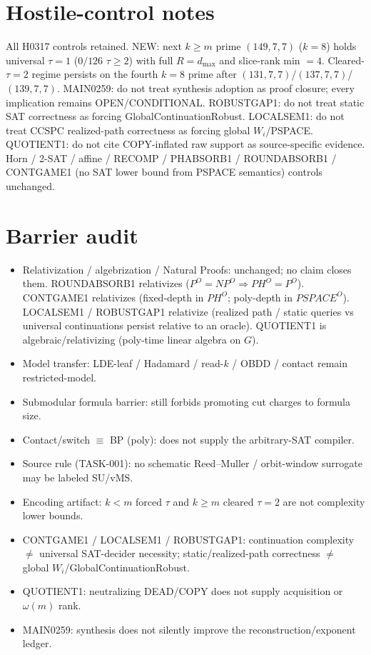 \documentclass[11pt]{article}
\begin{document}
\section*{Hostile-control notes}
All H0317 controls retained. NEW: next $k{\ge}m$ prime $(149,7,7)$ ($k{=}8$) holds universal
$\tau{=}1$ ($0/126$ $\tau{\ge}2$) with full $R{=}d_{\max}$ and slice-rank min $=4$.
Cleared-$\tau{=}2$ regime persists on the fourth $k{=}8$ prime after $(131,7,7)$/$(137,7,7)$/$(139,7,7)$.
MAIN0259: do not treat synthesis adoption as proof closure; every implication remains OPEN/CONDITIONAL.
ROBUSTGAP1: do not treat static SAT correctness as forcing GlobalContinuationRobust.
LOCALSEM1: do not treat CCSPC realized-path correctness as forcing global $W_i$/PSPACE.
QUOTIENT1: do not cite COPY-inflated raw support as source-specific evidence. Horn / 2-SAT / affine /
RECOMP / PHABSORB1 / ROUNDABSORB1 / CONTGAME1 (no SAT lower bound from PSPACE semantics)
controls unchanged.

\section*{Barrier audit}
\begin{itemize}
\item Relativization / algebrization / Natural Proofs: unchanged; no claim closes them.
  ROUNDABSORB1 relativizes ($P^O{=}NP^O\Rightarrow PH^O{=}P^O$).
  CONTGAME1 relativizes (fixed-depth in $PH^O$; poly-depth in $PSPACE^O$).
  LOCALSEM1 / ROBUSTGAP1 relativize (realized path / static queries vs universal continuations
  persist relative to an oracle).
  QUOTIENT1 is algebraic/relativizing (poly-time linear algebra on $G$).
\item Model transfer: LDE-leaf / Hadamard / read-$k$ / OBDD / contact remain restricted-model.
\item Submodular formula barrier: still forbids promoting cut charges to formula size.
\item Contact/switch $\equiv$ BP (poly): does not supply the arbitrary-SAT compiler.
\item Source rule (TASK-001): no schematic Reed--Muller / orbit-window surrogate may be labeled SU/vMS.
\item Encoding artifact: $k{<}m$ forced $\tau$ and $k{\ge}m$ cleared $\tau{=}2$ are not complexity lower bounds.
\item CONTGAME1 / LOCALSEM1 / ROBUSTGAP1: continuation complexity $\neq$ universal SAT-decider necessity;
  static/realized-path correctness $\neq$ global $W_i$/GlobalContinuationRobust.
\item QUOTIENT1: neutralizing DEAD/COPY does not supply acquisition or $\omega(m)$ rank.
\item MAIN0259: synthesis does not silently improve the reconstruction/exponent ledger.
\end{itemize}
\end{document}
